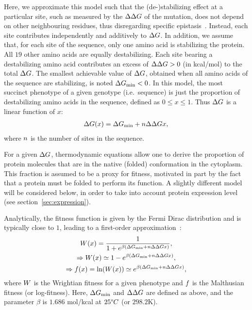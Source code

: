 \documentclass{article}
\begin{document}
Here, we approximate this model such that the (de-)stabilizing effect at a particular site, such as measured by the $\Delta \Delta G$ of the mutation, does not depend on other neighbouring residues, thus disregarding specific epistasis~\citep{Dasmeh2014}.
Instead, each site contributes independently and additively to $\Delta G$.
In addition, we assume that, for each site of the sequence, only one amino acid is stabilizing the protein.
All $19$ other amino acids are equally destabilizing.
Each site bearing a destabilizing amino acid contributes an excess of $\Delta \Delta G > 0$ (in kcal/mol) to the total $\Delta G$.
The smallest achievable value of $\Delta G$, obtained when all amino acids of the sequence are stabilizing, is noted $ \Delta G_{\text{min}} < 0$.
In this model, the most succinct {phenotype} of a given genotype (i.e.~sequence) is just the proportion of destabilizing amino acids in the sequence, defined as $0 \leq x \leq 1$.
Thus $\Delta G$ is a linear function of $x$:
\begin{align}
    \Delta G (x) = \Delta G_{\text{min}} + n \Delta \Delta G x,
\end{align}
where $n$ is the number of sites in the sequence.

For a given $\Delta G$, thermodynamic equations allow one to derive the proportion of protein molecules that are in the native (folded) conformation in the cytoplasm.
This fraction is assumed to be a proxy for fitness, motivated in part by the fact that a protein must be folded to perform its function.
A slightly different model will be considered below, in order to take into account protein expression level (see section~\ref{sec:expression}).

Analytically, the fitness function is given by the Fermi Dirac distribution and is typically close to $1$, leading to a first-order approximation~\citep{Goldstein2011}:
\begin{gather}
    W (x) = \dfrac{1}{1 + e^{\beta (\Delta G_{\text{min}} + n \Delta \Delta G x)}},\\
    \Rightarrow W (x) \simeq 1 - e^{\beta (\Delta G_{\text{min}} + n \Delta \Delta G x)},\\
    \Rightarrow f (x) = \ln ( W (x) ) \simeq e^{\beta (\Delta G_{\text{min}} + n \Delta \Delta G x)},
\end{gather}
where $W$ is the Wrightian fitness for a given {phenotype} and $f $ is the Malthusian fitness (or log-fitness).
Here, $\Delta G_{\text{min}}$ and $\Delta \Delta G$ are defined as above, and the parameter $\beta$ is $1.686$ mol/kcal at $25 \degree C$ (or $298.2$K).
\end{document}
